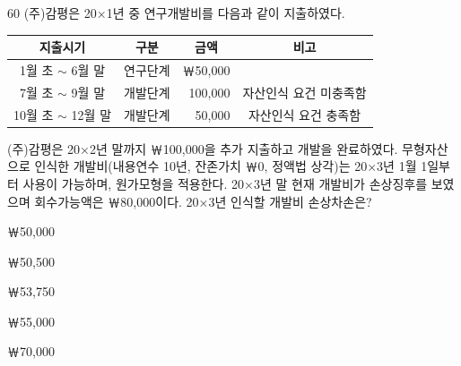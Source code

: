\begin{question}{60}
(주)감평은 20×1년 중 연구개발비를 다음과 같이 지출하였다.

{\small\centering\begin{tabular}{|c|c|r|c|}\hline
지출시기 & 구분 & \multicolumn{1}{c|}{금액} & 비고 \\ \hline
1월 초 $\sim$ 6월 말 & 연구단계 & ￦50,000 & \\ \hline
7월 초 $\sim$ 9월 말 & 개발단계 & 100,000 & 자산인식 요건 미충족함 \\ \hline
10월 초 $\sim$ 12월 말 & 개발단계 & 50,000 & 자산인식 요건 충족함 \\ \hline
\end{tabular}\par}
\vspace{4pt}
(주)감평은 20×2년 말까지 ￦100,000을 추가 지출하고 개발을 완료하였다. 무형자산으로 인식한 개발비(내용연수 10년, 잔존가치 ￦0, 정액법 상각)는 20×3년 1월 1일부터 사용이 가능하며, 원가모형을 적용한다. 20×3년 말 현재 개발비가 손상징후를 보였으며 회수가능액은 ￦80,000이다. 20×3년 인식할 개발비 손상차손은?
\begin{choices}
  \item ￦50,000
  \item ￦50,500
  \item ￦53,750
  \item ￦55,000
  \item ￦70,000
\end{choices}
\end{question}
